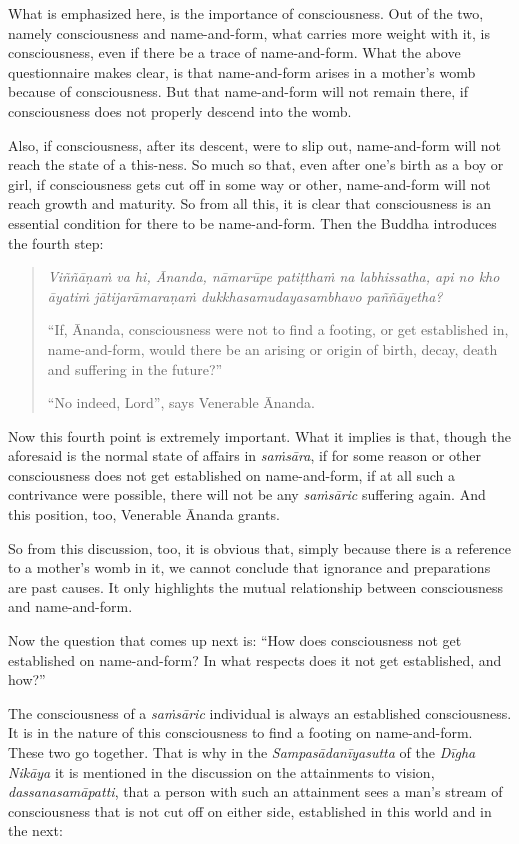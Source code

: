 What is emphasized here, is the importance of consciousness. Out of the two, namely consciousness and name-and-form, what carries more weight with it, is consciousness, even if there be a trace of name-and-form. What the above questionnaire makes clear, is that name-and-form arises in a mother's womb because of consciousness. But that name-and-form will not remain there, if consciousness does not properly descend into the womb.

Also, if consciousness, after its descent, were to slip out, name-and-form will not reach the state of a this-ness. So much so that, even after one's birth as a boy or girl, if consciousness gets cut off in some way or other, name-and-form will not reach growth and maturity. So from all this, it is clear that consciousness is an essential condition for there to be name-and-form. Then the Buddha introduces the fourth step:

\begin{quote}
\emph{Viññāṇaṁ va hi, Ānanda, nāmarūpe patiṭthaṁ na labhissatha, api no kho āyatiṁ jātijarāmaraṇaṁ dukkhasamudayasambhavo paññāyetha?}

``If, Ānanda, consciousness were not to find a footing, or get established in, name-and-form, would there be an arising or origin of birth, decay, death and suffering in the future?''

``No indeed, Lord'', says Venerable Ānanda.
\end{quote}

Now this fourth point is extremely important. What it implies is that, though the aforesaid is the normal state of affairs in \emph{saṁsāra}, if for some reason or other consciousness does not get established on name-and-form, if at all such a contrivance were possible, there will not be any \emph{saṁsāric} suffering again. And this position, too, Venerable Ānanda grants.

So from this discussion, too, it is obvious that, simply because there is a reference to a mother's womb in it, we cannot conclude that ignorance and preparations are past causes. It only highlights the mutual relationship between consciousness and name-and-form.

Now the question that comes up next is: ``How does consciousness not get established on name-and-form? In what respects does it not get established, and how?''

The consciousness of a \emph{saṁsāric} individual is always an established consciousness. It is in the nature of this consciousness to find a footing on name-and-form. These two go together. That is why in the \emph{Sampasādanīyasutta} of the \emph{Dīgha Nikāya} it is mentioned in the discussion on the attainments to vision, \emph{dassanasamāpatti}, that a person with such an attainment sees a man's stream of consciousness that is not cut off on either side, established in this world and in the next:

